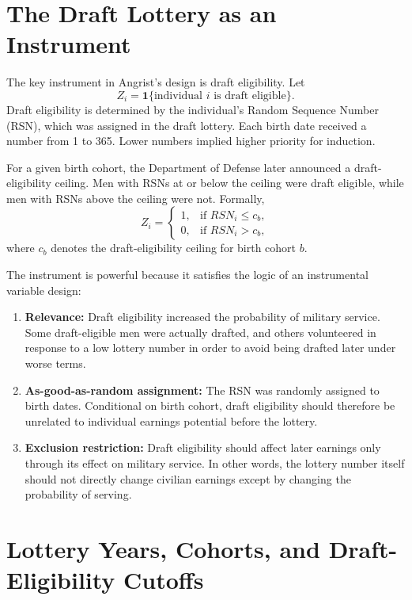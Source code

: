 \documentclass[11pt,a4paper]{article}
\begin{document}
\section{The Draft Lottery as an Instrument}

The key instrument in Angrist's design is draft eligibility. Let
\begin{equation}
    Z_i = \mathbf{1}\{\text{individual } i \text{ is draft eligible}\}.
\end{equation}
Draft eligibility is determined by the individual's Random Sequence Number (RSN), which was assigned in the draft lottery. Each birth date received a number from 1 to 365. Lower numbers implied higher priority for induction.

For a given birth cohort, the Department of Defense later announced a draft-eligibility ceiling. Men with RSNs at or below the ceiling were draft eligible, while men with RSNs above the ceiling were not. Formally,
\begin{equation}
    Z_i =
    \begin{cases}
        1, & \text{if } RSN_i \leq c_b, \\
        0, & \text{if } RSN_i > c_b,
    \end{cases}
\end{equation}
where $c_b$ denotes the draft-eligibility ceiling for birth cohort $b$.

The instrument is powerful because it satisfies the logic of an instrumental variable design:
\begin{enumerate}
    \item \textbf{Relevance:} Draft eligibility increased the probability of military service. Some draft-eligible men were actually drafted, and others volunteered in response to a low lottery number in order to avoid being drafted later under worse terms.
    \item \textbf{As-good-as-random assignment:} The RSN was randomly assigned to birth dates. Conditional on birth cohort, draft eligibility should therefore be unrelated to individual earnings potential before the lottery.
    \item \textbf{Exclusion restriction:} Draft eligibility should affect later earnings only through its effect on military service. In other words, the lottery number itself should not directly change civilian earnings except by changing the probability of serving.
\end{enumerate}


\section{Lottery Years, Cohorts, and Draft-Eligibility Cutoffs}
\end{document}
